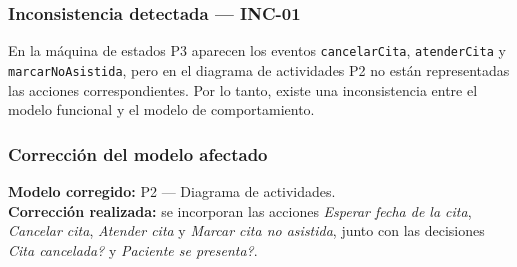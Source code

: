 \documentclass[11pt,a4paper,oneside]{article}
\begin{document}
\subsubsection*{Inconsistencia detectada --- INC-01}
En la m\'aquina de estados P3 aparecen los eventos \texttt{cancelarCita}, \texttt{atenderCita} y \texttt{marcarNoAsistida}, pero en el diagrama de actividades P2 no est\'an representadas las acciones correspondientes. Por lo tanto, existe una inconsistencia entre el modelo funcional y el modelo de comportamiento.

\subsubsection*{Correcci\'on del modelo afectado}
\textbf{Modelo corregido:} P2 --- Diagrama de actividades.\\
\textbf{Correcci\'on realizada:} se incorporan las acciones \textit{Esperar fecha de la cita}, \textit{Cancelar cita}, \textit{Atender cita} y \textit{Marcar cita no asistida}, junto con las decisiones \textit{\textquestiondown Cita cancelada?} y \textit{\textquestiondown Paciente se presenta?}.
\end{document}
